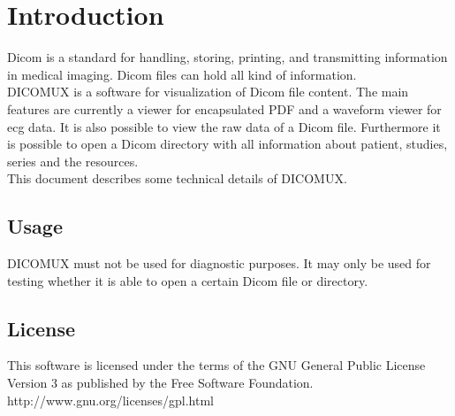 %
%
\chapter{Introduction}
Dicom is a standard for handling, storing, printing, and transmitting
information in medical imaging. Dicom files can hold all kind of information. \\
DICOMUX is a software for visualization of Dicom file content. The main features
are currently a viewer for encapsulated PDF and a waveform viewer for ecg data. 	
It is also possible to view the raw data of a Dicom file. Furthermore it is
possible to open a Dicom directory with all information about patient, studies,
series and the resources. \\
This document describes some technical details of DICOMUX.

\section{Usage}
DICOMUX must not be used for diagnostic purposes. It may only be used for testing whether it is able to open a certain Dicom file or directory.

\section{License}
This software is licensed under the terms of the GNU General Public License Version 3 as published by the Free Software Foundation. \\
http://www.gnu.org/licenses/gpl.html 
%
%